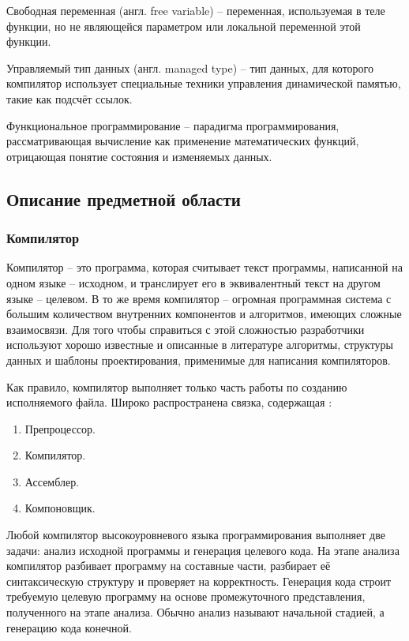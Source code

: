 \documentclass{imcs}
\begin{document}
Свободная переменная (англ. free variable) -- переменная, используемая в теле функции, но не
являющейся параметром или локальной переменной этой функции.

Управляемый тип данных (англ. managed type) -- тип данных, для которого компилятор
использует специальные техники управления динамической памятью,
такие как подсчёт ссылок\cite{delhpimanged}.

Функциональное программирование -- парадигма программирования,
рассматривающая вычисление как применение математических функций,
отрицающая понятие состояния и изменяемых данных.


\subsection{Описание предметной области}

\subsubsection{Компилятор}

Компилятор -- это программа, которая считывает текст программы, написанной на одном языке
-- исходном, и транслирует его в эквивалентный текст на другом языке -- целевом.
В то же время компилятор -- огромная программная система с большим количеством внутренних
компонентов и алгоритмов, имеющих сложные взаимосвязи. Для того чтобы справиться с этой
сложностью разработчики используют хорошо известные и описанные в литературе
алгоритмы, структуры данных и шаблоны проектирования, применимые для написания компиляторов.

Как правило, компилятор выполняет только часть работы по созданию исполняемого файла.
Широко распространена связка, содержащая \cite{dragonbook}:
\begin{enumerate}
    \item Препроцессор.
    \item Компилятор.
    \item Ассемблер.
    \item Компоновщик.
\end{enumerate}

Любой компилятор высокоуровневого языка программирования выполняет две задачи: анализ исходной программы
и генерация целевого кода. На этапе анализа компилятор разбивает программу на составные части, разбирает
её синтаксическую структуру и проверяет на корректность. Генерация кода строит требуемую целевую
программу на основе промежуточного представления, полученного на этапе анализа. Обычно анализ называют
начальной стадией, а генерацию кода конечной.
\end{document}
